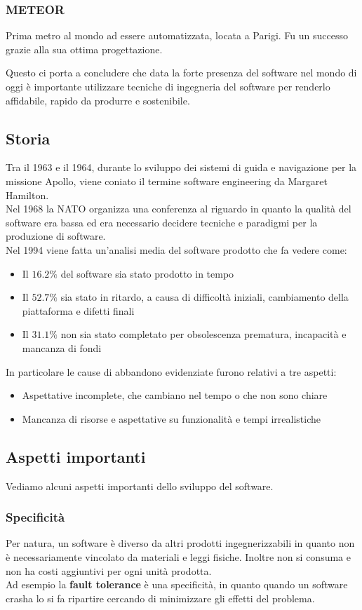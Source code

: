 \subsubsection{METEOR}
Prima metro al mondo ad essere automatizzata, locata a Parigi. Fu un successo grazie alla sua ottima progettazione.

Questo ci porta a concludere che data la forte presenza del software nel mondo di oggi è importante utilizzare tecniche di ingegneria del software per renderlo affidabile, rapido da produrre e sostenibile.

\subsection{Storia}
Tra il 1963 e il 1964, durante lo sviluppo dei sistemi di guida e navigazione per la missione Apollo, viene coniato il termine software engineering da Margaret Hamilton. \\
Nel 1968 la NATO organizza una conferenza al riguardo in quanto la qualità del software era bassa ed era necessario decidere tecniche e paradigmi per la produzione di software.\\
Nel 1994 viene fatta un'analisi media del software prodotto che fa vedere come:
\begin{itemize}
	\item Il $16.2\%$ del software sia stato prodotto in tempo
	\item Il $52.7\%$ sia stato in ritardo, a causa di difficoltà iniziali, cambiamento della piattaforma e difetti finali
	\item Il $31.1\%$ non sia stato completato per obsolescenza prematura, incapacità e mancanza di fondi
\end{itemize}
In particolare le cause di abbandono evidenziate furono relativi a tre aspetti:
\begin{itemize}
	\item Aspettative incomplete, che cambiano nel tempo o che non sono chiare
	\item Mancanza di risorse e aspettative su funzionalità e tempi irrealistiche 
\end{itemize}

\subsection{Aspetti importanti}
Vediamo alcuni aspetti importanti dello sviluppo del software.
\subsubsection{Specificità}
Per natura, un software è diverso da altri prodotti ingegnerizzabili in quanto non è necessariamente vincolato da materiali e leggi fisiche. Inoltre non si consuma e non ha costi aggiuntivi per ogni unità prodotta.\\
Ad esempio la \textbf{fault tolerance} è una specificità, in quanto quando un software crasha lo si fa ripartire cercando di minimizzare gli effetti del problema.
